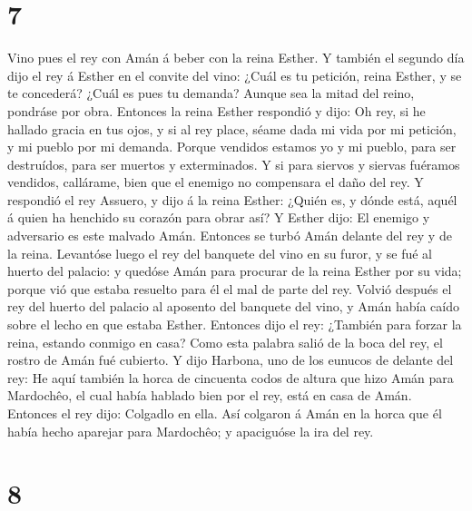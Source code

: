 \hypertarget{section-6}{%
\section{7}\label{section-6}}

 Vino pues el rey con Amán á beber con la reina Esther.
 Y también el segundo día dijo el rey á Esther en el convite
del vino: ¿Cuál es tu petición, reina Esther, y se te concederá? ¿Cuál
es pues tu demanda? Aunque sea la mitad del reino, pondráse por obra.
 Entonces la reina Esther respondió y dijo: Oh rey, si he
hallado gracia en tus ojos, y si al rey place, séame dada mi vida por mi
petición, y mi pueblo por mi demanda.  Porque vendidos
estamos yo y mi pueblo, para ser destruídos, para ser muertos y
exterminados. Y si para siervos y siervas fuéramos vendidos, callárame,
bien que el enemigo no compensara el daño del rey.  Y
respondió el rey Assuero, y dijo á la reina Esther: ¿Quién es, y dónde
está, aquél á quien ha henchido su corazón para obrar así? 
Y Esther dijo: El enemigo y adversario es este malvado Amán. Entonces se
turbó Amán delante del rey y de la reina.  Levantóse luego
el rey del banquete del vino en su furor, y se fué al huerto del
palacio: y quedóse Amán para procurar de la reina Esther por su vida;
porque vió que estaba resuelto para él el mal de parte del rey.
 Volvió después el rey del huerto del palacio al aposento
del banquete del vino, y Amán había caído sobre el lecho en que estaba
Esther. Entonces dijo el rey: ¿También para forzar la reina, estando
conmigo en casa? Como esta palabra salió de la boca del rey, el rostro
de Amán fué cubierto.  Y dijo Harbona, uno de los eunucos de
delante del rey: He aquí también la horca de cincuenta codos de altura
que hizo Amán para Mardochêo, el cual había hablado bien por el rey,
está en casa de Amán. Entonces el rey dijo: Colgadlo en ella.
 Así colgaron á Amán en la horca que él había hecho
aparejar para Mardochêo; y apaciguóse la ira del rey.

\hypertarget{section-7}{%
\section{8}\label{section-7}}

